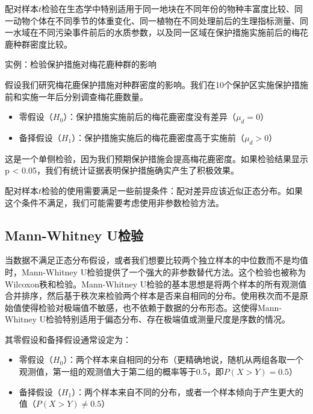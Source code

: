 \documentclass[
  twoside,12pt,fontset=none]{ctexbook}
\providecommand{\tightlist}{%
  \setlength{\itemsep}{0pt}\setlength{\parskip}{0pt}}
\renewenvironment{quote}{%
  \def\FrameCommand{{\color{quote-border}\vrule width 4pt}\hspace{10pt}}%
  \MakeFramed {\advance\hsize-\width \FrameRestore\noindent\ignorespaces}%
}{%
  \endMakeFramed
}
\begin{document}
配对样本\(t\)检验在生态学中特别适用于同一地块在不同年份的物种丰富度比较、同一动物个体在不同季节的体重变化、同一植物在不同处理前后的生理指标测量、同一水域在不同污染事件前后的水质参数，以及同一区域在保护措施实施前后的梅花鹿种群密度比较。

\begin{quote}
实例：检验保护措施对梅花鹿种群的影响

假设我们研究梅花鹿保护措施对种群密度的影响。我们在10个保护区实施保护措施前和实施一年后分别调查梅花鹿数量。

\begin{itemize}
\tightlist
\item
  零假设（\(H_0\)）：保护措施实施前后的梅花鹿密度没有差异（\(\mu_d = 0\)）
\item
  备择假设（\(H_1\)）：保护措施实施后的梅花鹿密度高于实施前（\(\mu_d > 0\)）
\end{itemize}

这是一个单侧检验，因为我们预期保护措施会提高梅花鹿密度。如果检验结果显示p \textless{} 0.05，我们有统计证据表明保护措施确实产生了积极效果。
\end{quote}

配对样本\(t\)检验的使用需要满足一些前提条件：配对差异应该近似正态分布。如果这个条件不满足，我们可能需要考虑使用非参数检验方法。

\hypertarget{mann-whitney-uux68c0ux9a8c}{%
\subsection{Mann-Whitney U检验}\label{mann-whitney-uux68c0ux9a8c}}

当数据不满足正态分布假设，或者我们想要比较两个独立样本的中位数而不是均值时，Mann-Whitney U检验提供了一个强大的非参数替代方法。这个检验也被称为Wilcoxon秩和检验。Mann-Whitney U检验的基本思想是将两个样本的所有观测值合并排序，然后基于秩次来检验两个样本是否来自相同的分布。使用秩次而不是原始值使得检验对极端值不敏感，也不依赖于数据的分布形态。这使得Mann-Whitney U检验特别适用于偏态分布、存在极端值或测量尺度是序数的情况。

其零假设和备择假设通常设定为：

\begin{itemize}
\tightlist
\item
  零假设（\(H_0\)）：两个样本来自相同的分布（更精确地说，随机从两组各取一个观测值，第一组的观测值大于第二组的概率等于0.5，即\(P(X > Y) = 0.5\)）
\item
  备择假设（\(H_1\)）：两个样本来自不同的分布，或者一个样本倾向于产生更大的值（\(P(X > Y) \neq 0.5\)）
\end{itemize}
\end{document}
